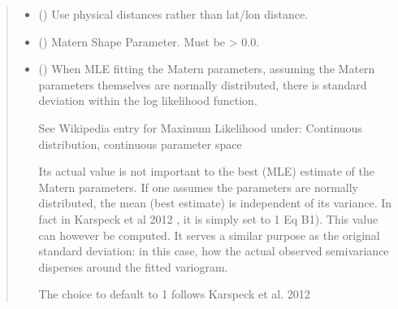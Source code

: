\documentclass[letterpaper,10pt,english]{sphinxmanual}
\begin{document}
\begin{fulllineitems}
\begin{quote}
\begin{description}
\begin{itemize}
\item {}
\sphinxAtStartPar
{} () \textendash{} Use physical distances rather than lat/lon distance.

\item {}
\sphinxAtStartPar
{} () \textendash{} Matern Shape Parameter. Must be \textgreater{} 0.0.

\item {}
\sphinxAtStartPar
{} () \textendash{}
\sphinxAtStartPar
When MLE fitting the Matern parameters,
assuming the Matern parameters themselves
are normally distributed,
there is standard deviation within the log likelihood function.

\sphinxAtStartPar
See Wikipedia entry for Maximum Likelihood under:
\sphinxhyphen{} Continuous distribution, continuous parameter space

\sphinxAtStartPar
Its actual value is not important
to the best (MLE) estimate of the Matern parameters.
If one assumes the parameters are normally distributed,
the mean (best estimate) is independent of its variance.
In fact in Karspeck et al 2012 , it is simply set to 1
Eq B1).
This value can however be computed. It serves a similar purpose as
the original standard deviation:
in this case, how the actual observed semivariance disperses
around the fitted variogram.

\sphinxAtStartPar
The choice to default to 1 follows Karspeck et al. 2012 


\end{itemize}

\end{description}\end{quote}


\end{fulllineitems}
\end{document}
